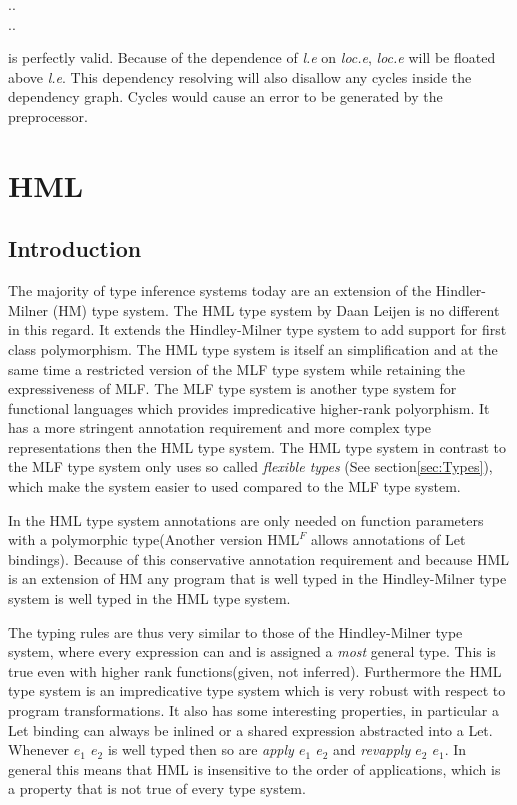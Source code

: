 \documentclass[twoside, titlepage, openright, a4paper]{book}
\newcommand{\Varid}[1]{\mathit{#1}}
\def\resethooks{%
  \global\let\SaveRestoreHook\empty
  \global\let\ColumnHook\empty}
\let\hspre\empty
\let\hspost\empty
\begin{document}
\begin{hscode}\SaveRestoreHook
\column{B}{@{}>{\hspre}l<{\hspost}@{}}%
\column{E}{@{}>{\hspre}l<{\hspost}@{}}%
\>[B]{}\Varid{l}\mbox{.}\Varid{e}\mathrel{=}\mbox{.}\Varid{e}{}\<[E]%
\\
\>[B]{}\mbox{.}\Varid{e}\mathrel{=}\Varid{m}\mbox{.}\Varid{l}{}\<[E]%
\ColumnHook
\end{hscode}\resethooks

is perfectly valid. Because of the dependence of \emph{l.e} on \emph{loc.e}, \emph{loc.e} will be floated above \emph{l.e}. This dependency resolving will also disallow any cycles inside the dependency graph. Cycles would cause an error to be generated by the preprocessor.


\chapter{HML}
\label{HML}
\section{Introduction}
The majority of type inference systems today are an extension of the  Hindler-Milner (HM)\cite{HM} type system. The HML\cite{HML} type system by Daan Leijen is no different in this regard. It extends the Hindley-Milner type system to add support for first class polymorphism. The HML type system is itself an simplification and at the same time a restricted version of the MLF\cite{MLF} type system while retaining the expressiveness of MLF. The MLF type system is another type system for functional languages which provides impredicative higher-rank polyorphism. It has a more stringent annotation requirement and more complex type representations then the HML type system. The HML type system in contrast to the MLF type system only uses so called \emph{flexible types} (See section\ref{sec:Types}), which make the system easier to used compared to the  MLF type system.

In the HML type system annotations are only needed on function parameters with a polymorphic type(Another version $\textrm{HML}^F$ allows annotations of Let bindings). Because of this conservative annotation requirement and because HML is an extension of HM any program that is well typed in the Hindley-Milner type system is well typed in the HML type system.

The typing rules are thus very similar to those of the Hindley-Milner type system, where every expression can and is assigned a \emph{most} general type. This is true even with higher rank functions(given, not inferred). Furthermore the HML type system is an impredicative type system which is very robust with respect to program transformations. It also has some interesting properties, in particular a Let binding can always be inlined or a shared expression abstracted into a Let. Whenever \emph{$e_1$ $e_2$} is well typed then so are \emph{apply $e_1$ $e_2$} and \emph{revapply $e_2$ $e_1$}. In general this means that HML is insensitive to the order of applications, which is a property that is not true of every type system.
\end{document}
